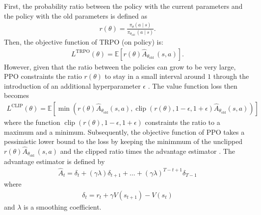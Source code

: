 First, the probability ratio between the policy with the current parameters and the policy with the old parameters is defined as
\begin{gather}
    r(\theta)=\frac{\pi_{\theta}(a \mid s)}{\pi_{\theta_{\text {old }}}(a \mid s)}.
    \label{eu_policy_gradient_probability_ratio}
    
\end{gather}
Then, the objective function of TRPO (on policy) is:
\begin{gather}
  L^{\mathrm{TRPO}}(\theta)=\mathbb{E}\left[r(\theta) \hat{A}_{\theta_{\text {old }}}(s, a)\right].
  \label{eu_ppo_policy_trpo_objective_function}
\end{gather}
However, given that the ratio between the policies can grow to be very large, PPO constraints the ratio $r(\theta)$ to stay in a small interval around $1$ through the introduction of an additional hyperparameter $\epsilon$ \cite{schulman2017proximal}. The value function loss then becomes
\begin{gather}
    L^{\mathrm{CLIP}}(\theta)=\mathbb{E}\left[\min \left(r(\theta) \hat{A}_{\theta_{\mathrm{old}}}(s, a), \operatorname{clip}(r(\theta), 1-\epsilon, 1+\epsilon) \hat{A}_{\theta_{\mathrm{old}}}(s, a)\right)\right]
    \label{eu_ppo_value_function}
\end{gather}
where the function $\operatorname{clip}(r(\theta), 1-\epsilon, 1+\epsilon)$ constraints the ratio to a maximum and a minimum. Subsequently, the objective function of PPO takes a pessimistic lower bound to the loss by keeping the minimmum of the unclipped $r(\theta) \hat{A}_{\theta_{\text {old }}}(s, a)$ and the clipped ratio times the advantage estimator \cite{schulman2017proximal}. The advantage estimator is defined by
\begin{gather}
  \hat{A}_{t}=\delta_{t}+(\gamma \lambda) \delta_{t+1}+\ldots+(\gamma \lambda)^{T-t+1} \delta_{T-1}
  \label{eu_ppo_advantage_estimator}
\end{gather}
where
\begin{gather}
  \delta_{t}=r_{t}+\gamma V(s_{t+1})-V(s_{t})
  \label{eu_ppo_smoothing_coeff}
\end{gather}
and $\lambda$ is a smoothing coefficient. 
  

